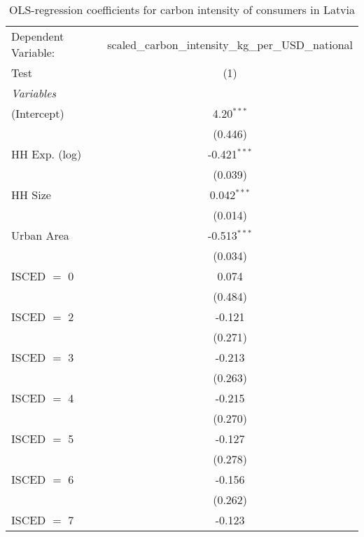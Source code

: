 
\begin{table}[htbp!]
   \centering
   \small
   \begin{adjustbox}{width = 1\textwidth, max height = 0.95\textheight, center}
      \begin{threeparttable}[b]
         \caption{\label{tab:OLS_1_LVA} OLS-regression coefficients for carbon intensity of consumers in Latvia}
         \begin{tabular}{lc}
            \tabularnewline \midrule \midrule
            Dependent Variable: & scaled\_carbon\_intensity\_kg\_per\_USD\_national\\        
            Test                & (1)\\  
            \midrule
            \emph{Variables}\\
            (Intercept)         & 4.20$^{***}$\\   
                                & (0.446)\\   
            HH Exp. (log)       & -0.421$^{***}$\\   
                                & (0.039)\\   
            HH Size             & 0.042$^{***}$\\   
                                & (0.014)\\   
            Urban Area          & -0.513$^{***}$\\   
                                & (0.034)\\   
            ISCED $=$ 0         & 0.074\\   
                                & (0.484)\\   
            ISCED $=$ 2         & -0.121\\   
                                & (0.271)\\   
            ISCED $=$ 3         & -0.213\\   
                                & (0.263)\\   
            ISCED $=$ 4         & -0.215\\   
                                & (0.270)\\   
            ISCED $=$ 5         & -0.127\\   
                                & (0.278)\\   
            ISCED $=$ 6         & -0.156\\   
                                & (0.262)\\   
            ISCED $=$ 7         & -0.123\\   

\end{tabular}
\end{threeparttable}
\end{adjustbox}
\end{table}
